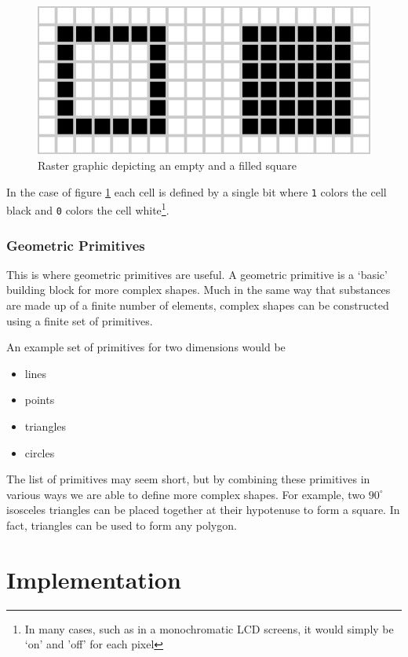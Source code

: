 \documentclass[authoryearcitations]{UoYCSproject}
\begin{document}
\begin{figure}[h]
  \centering
  \includegraphics[scale=0.7]{figures/rasterSquare.eps}
    \caption{Raster graphic depicting an empty and a filled square}
  \label{rasterSquare}
\end{figure}

In the case of figure \ref{rasterSquare} each cell is defined by a single bit where \verb+1+ colors the cell black and
\verb+0+ colors the cell white\footnote{In many cases, such as in a monochromatic LCD screens, it would simply be 
`on' and 'off' for 
each pixel}. 


\subsection{Geometric Primitives}

This is where geometric primitives are useful. A geometric primitive is a `basic' building block for more complex shapes. 
Much in the same way that substances are made up of a finite number of elements, complex shapes can be constructed using
a finite set of primitives. 

An example set of primitives for two dimensions would be

\begin{itemize}
        \item lines
        \item points
        \item triangles
        \item circles
\end{itemize}

The list of primitives may seem short, but by combining these primitives in various ways we are able to define more
complex shapes. For example, two $90^{\circ}$ isosceles triangles can be placed together at their hypotenuse to form 
a square. In fact, triangles can be used to form any polygon. 

\chapter{Implementation}
\end{document}
